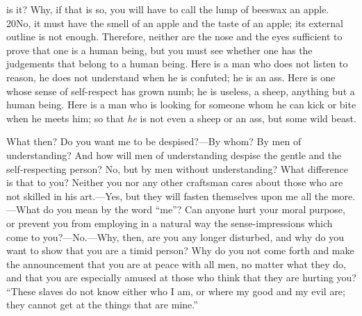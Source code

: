 is it? Why, if that is so, you will have to call the lump of beeswax an apple. 20No, it must have the smell of an apple and the taste of an apple; its external outline is not enough. Therefore, neither are the nose and the eyes sufficient to prove that one is a human being, but you must see whether one has the judgements that belong to a human being. Here is a man who does not listen to reason, he does not understand when he is confuted; he is an ass. Here is one whose sense of self-respect has grown numb; he is useless, a sheep, anything but a human being. Here is a man who is looking for someone whom he can kick or bite when he meets him; so that \emph{he} is not even a sheep or an ass, but some wild beast.

What then? Do you want me to be despised?—By whom? By men of understanding? And how will men of understanding despise the gentle and the self-respecting person? No, but by men without understanding? What difference is that to you? Neither you nor any other craftsman cares about those who are not skilled in his art.—Yes, but they will fasten themselves upon me all the more.—What do you mean by the word ``me''? Can anyone hurt your moral purpose, or prevent you from employing in a natural way the sense-impressions which come to you?—No.—Why, then, are you any longer disturbed, and why do you want to show that you are a timid person? Why do you not come forth and make the announcement that you are at peace with all men, no matter what they do, and that you are especially amused at those who think that they are hurting you? ``These slaves do not know either who I am, or where my good and my evil are; they cannot get at the things that are mine.''

